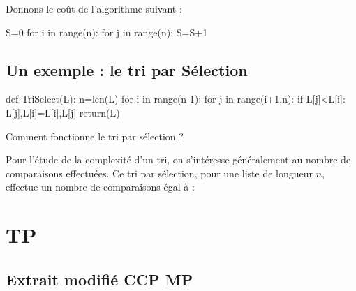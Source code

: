 \documentclass[french,11pt,twoside]{VcCours}
\begin{document}
\begin{Exercice}{} Donnons le coût de l'algorithme suivant : 
\end{Exercice}
\begin{minipage}{\linewidth}
\begin{Python}
S=0
for i in range(n):
    for j in range(n):
        S=S+1
\end{Python} 
\end{minipage}

\vspace{4cm}



\subsection{Un exemple : le tri par Sélection}

\begin{Python}
def TriSelect(L):
    n=len(L)
    for i in range(n-1):
        for j in range(i+1,n):
            if L[j]<L[i]:
                L[j],L[i]=L[i],L[j]
    return(L)
\end{Python} 
Comment fonctionne le tri par sélection ?

\vspace{4cm}

Pour l'étude de la complexité d'un tri, on s'intéresse généralement au nombre de comparaisons effectuées. Ce tri par sélection, pour une liste de longueur $n$, effectue un nombre de comparaisons égal à :

\vspace{3cm}

\newpage
\section{TP}
\subsection{Extrait modifié CCP MP}
\end{document}

